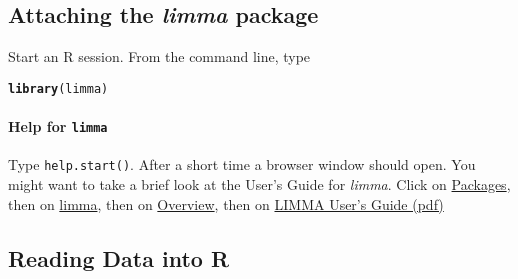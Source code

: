 \documentclass[a4paper,9pt]{article}\usepackage[]{graphicx}\usepackage[]{color}
\makeatletter
\newcommand{\hlstd}[1]{\textcolor[rgb]{0.345,0.345,0.345}{#1}}%
\newcommand{\hlkwd}[1]{\textcolor[rgb]{0.737,0.353,0.396}{\textbf{#1}}}%
\newenvironment{kframe}{%
 \def\at@end@of@kframe{}%
 \ifinner\ifhmode%
  \def\at@end@of@kframe{\end{minipage}}%
  \begin{minipage}{\columnwidth}%
 \fi\fi%
 \def\FrameCommand##1{\hskip\@totalleftmargin \hskip-\fboxsep
 \colorbox{shadecolor}{##1}\hskip-\fboxsep
     \hskip-\linewidth \hskip-\@totalleftmargin \hskip\columnwidth}%
 \MakeFramed {\advance\hsize-\width
   \@totalleftmargin\z@ \linewidth\hsize
   \@setminipage}}%
 {\par\unskip\endMakeFramed%
 \at@end@of@kframe}
\newenvironment{knitrout}{}{} %
\makeatother
\begin{document}
\subsection*{Attaching the \textit{limma} package}

Start an R session.  From the command line, type
\begin{knitrout}
\color{fgcolor}\begin{kframe}
\begin{alltt}
\hlkwd{library}\hlstd{(limma)}
\end{alltt}
\end{kframe}
\end{knitrout}

\paragraph{Help for \texttt{limma}}

Type \texttt{help.start()}.  After a short time a browser window should
open.  You might want to take a brief look at the User's Guide for
\textit{limma}.  Click on \underline{Packages}, then on
\underline{limma}, then on \underline{Overview}, then on
\underline{LIMMA User's Guide (pdf)}

\subsection{Reading Data into R}
\end{document}

